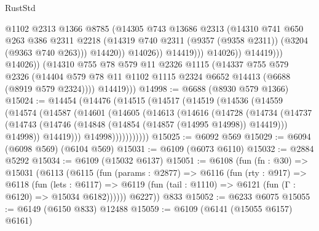 \begin{lexlean}{RustStd}
\begin{coremodule}
                                @1102
                                @2313
                                @1366
                                @8785
                                (@14305
                                  @743
                                  @13686
                                  @2313
                                  (@14310
                                    @741
                                    @650
                                    @263
                                    @386
                                    @2311
                                    @2218
                                    (@14319
                                      @740
                                      @2311
                                      (@9357 (@9358 @2311))
                                      (@3204 (@9363 @740 @263)))
                                    @14420))
                                @14026))
                            @14419)))
                      @14026))
                  @14419)))
            @14026))
        (@14310
          @755
          @78
          @579
          @11
          @2326
          @1115
          (@14337
            @755
            @579
            @2326
            (@14404 @579 @78 @11 @1102 @1115 @2324 @6652 @14413 (@6688 (@8919 @579 @2324))))
          @14419)))
@14998 := @6688 (@8930 @579 @1366)
@15024 := @14454
    (@14476
      (@14515
        (@14517
          (@14519
            (@14536
              (@14559
                (@14574
                  (@14587
                    (@14601
                      (@14605
                        (@14613
                          (@14616
                            (@14728
                              (@14734
                                (@14737
                                  (@14743
                                    (@14746 (@14848 (@14854 (@14857 (@14995 @14998)) @14419)))
                                    @14998))
                                @14419)))
                          @14998)))))))))))
@15025 := @6092 @569
@15029 := @6094 (@6098 @569) (@6104 @569)
@15031 := @6109 (@6073 @6110)
@15032 := @2884 @5292
@15034 := @6109 (@15032 @6137)
@15051 := @6108
    (fun (fn : @30) =>
    @15031
      (@6113
        (@6115
          (fun (params : @2877) =>
          @6116
            (fun (rty : @917) =>
            @6118
              (fun (lets : @6117) =>
              @6119 (fun (tail : @1110) => @6121 (fun (Γ : @6120) => @15034 @6182))))))
        @6227))
    @833
@15052 := @6233 @6075
@15055 := @6149 (@6150 @833) @12488
@15059 := @6109 (@6141 (@15055 @6157) @6161)

\end{coremodule}
\end{lexlean}
